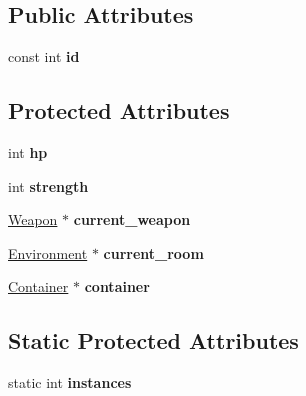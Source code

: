 \subsection*{Public Attributes}
\begin{DoxyCompactItemize}
\item 
\hypertarget{classda__game_1_1Actor_aa469aa0319da09f045ec836890fabf6a}{
const int {\bfseries id}}
\label{classda__game_1_1Actor_aa469aa0319da09f045ec836890fabf6a}

\end{DoxyCompactItemize}
\subsection*{Protected Attributes}
\begin{DoxyCompactItemize}
\item 
\hypertarget{classda__game_1_1Actor_ab5a5b98560a294c0feb2ccf5efb622ea}{
int {\bfseries hp}}
\label{classda__game_1_1Actor_ab5a5b98560a294c0feb2ccf5efb622ea}

\item 
\hypertarget{classda__game_1_1Actor_a134949b1c3dfe71dcadba6d6f9f0d13a}{
int {\bfseries strength}}
\label{classda__game_1_1Actor_a134949b1c3dfe71dcadba6d6f9f0d13a}

\item 
\hypertarget{classda__game_1_1Actor_ac5cc7b2e4c41e85f4222750065be7d80}{
\hyperlink{classda__game_1_1Weapon}{Weapon} $\ast$ {\bfseries current\_\-weapon}}
\label{classda__game_1_1Actor_ac5cc7b2e4c41e85f4222750065be7d80}

\item 
\hypertarget{classda__game_1_1Actor_a0c71533d0498330db5c211bc60147266}{
\hyperlink{classda__game_1_1Environment}{Environment} $\ast$ {\bfseries current\_\-room}}
\label{classda__game_1_1Actor_a0c71533d0498330db5c211bc60147266}

\item 
\hypertarget{classda__game_1_1Actor_a05f20995be69cd1d818936f539cee7f7}{
\hyperlink{classda__game_1_1Container}{Container} $\ast$ {\bfseries container}}
\label{classda__game_1_1Actor_a05f20995be69cd1d818936f539cee7f7}

\end{DoxyCompactItemize}
\subsection*{Static Protected Attributes}
\begin{DoxyCompactItemize}
\item 
\hypertarget{classda__game_1_1Actor_a667364acb9cf6d06df598eeee2675212}{
static int {\bfseries instances}}
\label{classda__game_1_1Actor_a667364acb9cf6d06df598eeee2675212}

\end{DoxyCompactItemize}
